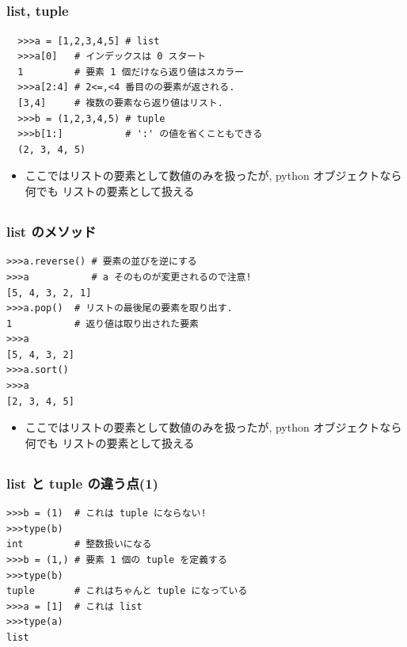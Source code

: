 \subsection*{\redm\whiteb\greenb}
\begin{frame}[t,fragile]
 \frametitle{list, tuple}
 \begin{lstlisting}
  >>>a = [1,2,3,4,5] # list
  >>>a[0]   # インデックスは 0 スタート
  1         # 要素 1 個だけなら返り値はスカラー
  >>>a[2:4] # 2<=,<4 番目のの要素が返される. 
  [3,4]     # 複数の要素なら返り値はリスト. 
  >>>b = (1,2,3,4,5) # tuple
  >>>b[1:]           # ':' の値を省くこともできる
  (2, 3, 4, 5)
 \end{lstlisting}
 \begin{itemize}
  \item ここではリストの要素として数値のみを扱ったが, python オブジェクトなら何でも リストの要素として扱える
 \end{itemize}
\end{frame}

\subsection*{\redm\whitem\greenb}
\begin{frame}[t,fragile]
\frametitle{list のメソッド}
\begin{lstlisting}
>>>a.reverse() # 要素の並びを逆にする
>>>a           # a そのものが変更されるので注意!
[5, 4, 3, 2, 1]
>>>a.pop()  # リストの最後尾の要素を取り出す. 
1           # 返り値は取り出された要素
>>>a
[5, 4, 3, 2]
>>>a.sort()
>>>a
[2, 3, 4, 5]
\end{lstlisting}
\begin{itemize}
\item ここではリストの要素として数値のみを扱ったが, python オブジェクトなら何でも リストの要素として扱える
\end{itemize}
\end{frame}

\subsection*{\redm\whitem\greenb}
\begin{frame}[t,fragile]
\frametitle{list と tuple の違う点(1)}
\begin{lstlisting}
>>>b = (1)  # これは tuple にならない!
>>>type(b)
int         # 整数扱いになる
>>>b = (1,) # 要素 1 個の tuple を定義する
>>>type(b)
tuple       # これはちゃんと tuple になっている
>>>a = [1]  # これは list
>>>type(a)
list
\end{lstlisting}
\end{frame}


